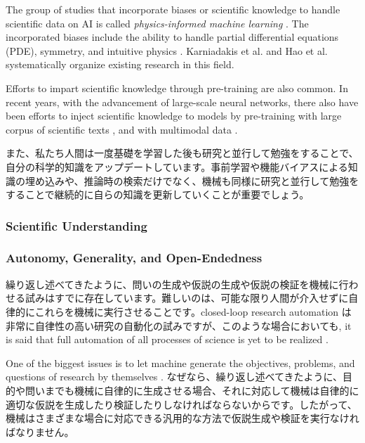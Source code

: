 The group of studies that incorporate biases or scientific knowledge to handle scientific data on AI is called \textit{physics-informed machine learning} \cite{karniadakis2021physics}. The incorporated biases include the ability to handle partial differential equations (PDE), symmetry, and intuitive physics \cite{hao2022physics}. Karniadakis et al. \cite{karniadakis2021physics} and Hao et al. \cite{hao2022physics} systematically organize existing research in this field. 

Efforts to impart scientific knowledge through pre-training are also common. In recent years, with the advancement of large-scale neural networks, there also have been efforts to inject scientific knowledge to models by pre-training with large corpus of scientific texts \cite{taylor2022galactica,beltagy2019scibert}, and with multimodal data \cite{singhal2023towards}.

また、私たち人間は一度基礎を学習した後も研究と並行して勉強をすることで、自分の科学的知識をアップデートしています。事前学習や機能バイアスによる知識の埋め込みや、推論時の検索だけでなく、機械も同様に研究と並行して勉強をすることで継続的に自らの知識を更新していくことが重要でしょう。

\subsubsection{Scientific Understanding}

\subsubsection{Autonomy, Generality, and Open-Endedness}
繰り返し述べてきたように、問いの生成や仮説の生成や仮説の検証を機械に行わせる試みはすでに存在しています。難しいのは、可能な限り人間が介入せずに自律的にこれらを機械に実行させることです。closed-loop research automation は非常に自律性の高い研究の自動化の試みですが、このような場合においても,  it is said that full automation of all processes of science is yet to be realized \cite{zenil2023,coley2020autonomous,coley2020autonomousII}. 

One of the biggest issues is to let machine generate the objectives, problems, and questions of research by themselves \cite{coley2020autonomousII}. なぜなら、繰り返し述べてきたように、目的や問いまでも機械に自律的に生成させる場合、それに対応して機械は自律的に適切な仮説を生成したり検証したりしなければならないからです。したがって、機械はさまざまな場合に対応できる汎用的な方法で仮説生成や検証を実行なければなりません。

